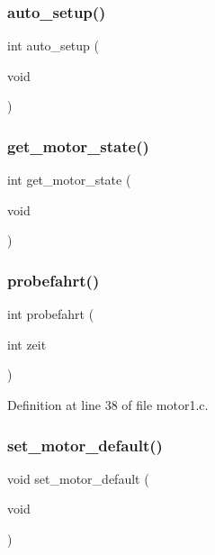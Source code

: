 \subsubsection{auto\+\_\+setup()}
{\footnotesize\ttfamily int auto\+\_\+setup (\begin{DoxyParamCaption}\item[{void}]{ }\end{DoxyParamCaption})}

\mbox{\label{motor_8h_a2ed995e7fff99b58503e04aa1ef654d2}} 
\subsubsection{get\+\_\+motor\+\_\+state()}
{\footnotesize\ttfamily int get\+\_\+motor\+\_\+state (\begin{DoxyParamCaption}\item[{void}]{ }\end{DoxyParamCaption})}

\mbox{\label{motor_8h_aa3482fd571b315d112e8514a1b765b75}} 
\subsubsection{probefahrt()}
{\footnotesize\ttfamily int probefahrt (\begin{DoxyParamCaption}\item[{int}]{zeit }\end{DoxyParamCaption})}



Definition at line 38 of file motor1.\+c.

\mbox{\label{motor_8h_a6714a13b472fc461d4c33f94015b4236}} 
\subsubsection{set\+\_\+motor\+\_\+default()}
{\footnotesize\ttfamily void set\+\_\+motor\+\_\+default (\begin{DoxyParamCaption}\item[{void}]{ }\end{DoxyParamCaption})}

